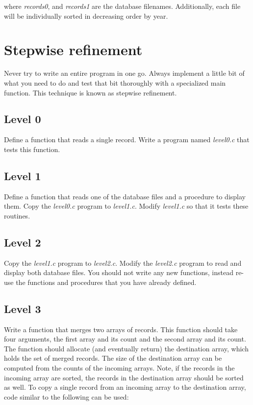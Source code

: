 \documentclass{article}
\begin{document}
where {\it records0}, and {\it records1} are the database filenames.  Additionally, each
file will be individually sorted in decreasing order by year.

\section*{Stepwise refinement}

Never try to write an entire program in one go. Always implement a little bit of what you need to do and test that bit thoroughly with a specialized main function. This technique is known as stepwise refinement.

\subsection*{Level 0}
Define a function that reads a single record.
Write a program named {\it level0.c} that tests this function.

\subsection*{Level 1}
Define a function that reads one of the database files and
a procedure to display them.
Copy the {\it level0.c} program to {\it level1.c}.
Modify {\it level1.c} so that it tests these routines.

\subsection*{Level 2}
Copy the {\it level1.c} program to {\it level2.c}.
Modify the {\it level2.c} program to read and display both database files.
You should not write any
new functions, instead re-use the functions and procedures
that you have already defined.

\subsection*{Level 3}
Write a function that merges two arrays of records. This function
should take four arguments, the first array and its count and
the second array and its count.
The function should allocate (and eventually return) the destination
array, which holds the set of merged records.
The size of the destination array can be computed from the 
counts of the incoming arrays.
Note, if the records in the incoming array are sorted, the
records in the destination array should be sorted as well.
To copy a single record from an incoming array to the destination
array, code similar to the following can be used:
\end{document}
